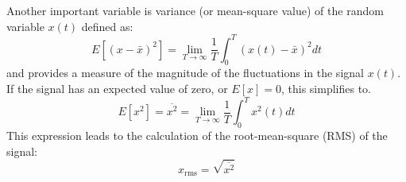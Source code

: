 \documentclass[12pt,letter]{article}
\begin{document}
Another important variable is variance (or mean-square value) of the random variable $x(t)$ defined as:
\begin{equation}
E[(x-\bar{x})^2] = \lim\limits_{T \rightarrow \infty} \frac{1}{T} \int_{0}^{T}(x(t)-\bar{x})^2dt
\end{equation}
and provides a measure of the magnitude of the fluctuations in the signal $x(t)$. If the signal has an expected value of zero, or $E[x]=0$, this simplifies to. 
\begin{equation}
E[x^2] = \overline{x^2} = \lim\limits_{T \rightarrow \infty} \frac{1}{T} \int_{0}^{T}x^2(t)dt
\end{equation}
This expression leads to the calculation of the root-mean-square (RMS) of the signal:
\begin{equation}
x_\text{rms} = \sqrt{\overline{x^2}} 
\end{equation}
\end{document}

